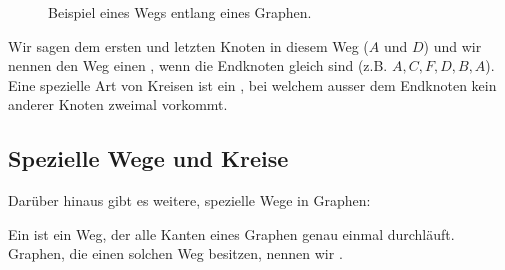 \begin{figure}[H]
    \centering
    \caption{Beispiel eines Wegs entlang eines Graphen.}
    \label{fig:graph-ex-weg}
\end{figure}

Wir sagen dem ersten und letzten Knoten in diesem Weg ($A$ und $D$)  und wir nennen den Weg einen , wenn die Endknoten gleich sind (z.B. $A,C,F,D,B,A$). Eine spezielle Art von Kreisen ist ein , bei welchem ausser dem Endknoten kein anderer Knoten zweimal vorkommt.

\subsection{Spezielle Wege und Kreise}
Darüber hinaus gibt es weitere, spezielle Wege in Graphen:

Ein  ist ein Weg, der alle Kanten eines Graphen genau einmal durchläuft. Graphen, die einen solchen Weg besitzen, nennen wir .

